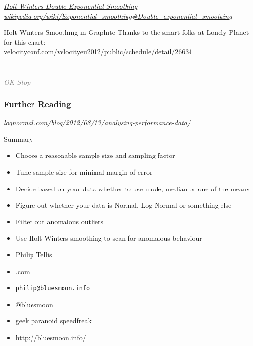 \documentclass{beamer}
\newcommand{\innersplash}[1]{
  \begin{center}
    \Large \textrm{\textit{ #1 } }
  \end{center}
}
\newcommand{\splashslide}[2][{}]{
  \begin{frame}
  \frametitle{#1}
  \innersplash{#2}
  \end{frame}
}
\newcommand{\leadinslide}[2]{
  \splashslide{
     {\fontsize{150}{20}\selectfont{\raisebox{0pt}[90pt][0pt]{\textcolor{light-gray}{#1}}}} \\ \huge \textcolor{gray}{#2}
  }
}
\begin{document}
\splashslide{\href{http://en.wikipedia.org/wiki/Exponential\_smoothing\#Double\_exponential\_smoothing}{Holt-Winters Double Exponential Smoothing \\ \tiny wikipedia.org/wiki/Exponential\_smoothing\#Double\_exponential\_smoothing}}

\begin{frame}{Holt-Winters Smoothing in Graphite}
  \vspace{12pt}
  Thanks to the smart folks at Lonely Planet for this chart: \\
  \href{http://velocityconf.com/velocityeu2012/public/schedule/detail/26634}{velocityconf.com/velocityeu2012/public/schedule/detail/26634}
\end{frame}

\leadinslide{--}{OK Stop}

\splashslide[Further Reading]{\href{http://www.lognormal.com/blog/2012/08/13/analysing-performance-data/}{lognormal.com/blog/2012/08/13/analysing-performance-data/}}

\begin{frame}{Summary}
  \begin{itemize}
  \item Choose a reasonable sample size and sampling factor
  \item Tune sample size for minimal margin of error
  \item Decide based on your data whether to use mode, median or one of the means
  \item Figure out whether your data is Normal, Log-Normal or something else
  \item Filter out anomalous outliers
  \item Use Holt-Winters smoothing to scan for anomalous behaviour
  \end{itemize}
\end{frame}


\begin{frame}
  \begin{itemize}
  \item Philip Tellis
  \item \href{http://www.lognormal.com/}{\textrm{\textcolor{med-gray}{.com}}}
  \item \small{\texttt{philip@bluesmoon.info}}
  \item \href{http://twitter.com/bluesmoon}{@bluesmoon}
  \item geek paranoid speedfreak
  \item \href{http://bluesmoon.info/}{http://bluesmoon.info/}
  \end{itemize}
\end{frame}
\end{document}
